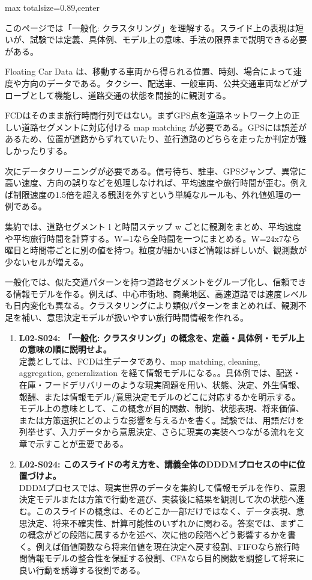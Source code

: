 \begin{minipage}[t]{0.58\textwidth}
\begin{adjustbox}{max totalsize={\textwidth}{0.89\textheight},center}
\begin{minipage}{\textwidth}\scriptsize
{}このページでは「一般化: クラスタリング」を理解する。スライド上の表現は短いが、試験では定義、具体例、モデル上の意味、手法の限界まで説明できる必要がある。\par
Floating Car Data は、移動する車両から得られる位置、時刻、場合によって速度や方向のデータである。タクシー、配送車、一般車両、公共交通車両などがプローブとして機能し、道路交通の状態を間接的に観測する。\par
FCDはそのまま旅行時間行列ではない。まずGPS点を道路ネットワーク上の正しい道路セグメントに対応付ける map matching が必要である。GPSには誤差があるため、位置が道路からずれていたり、並行道路のどちらを走ったか判定が難しかったりする。\par
次にデータクリーニングが必要である。信号待ち、駐車、GPSジャンプ、異常に高い速度、方向の誤りなどを処理しなければ、平均速度や旅行時間が歪む。例えば制限速度の1.5倍を超える観測を外すという単純なルールも、外れ値処理の一例である。\par
集約では、道路セグメント l と時間ステップ w ごとに観測をまとめ、平均速度や平均旅行時間を計算する。W=1なら全時間を一つにまとめる。W=24x7なら曜日と時間帯ごとに別の値を持つ。粒度が細かいほど情報は詳しいが、観測数が少ないセルが増える。\par
一般化では、似た交通パターンを持つ道路セグメントをグループ化し、信頼できる情報モデルを作る。例えば、中心市街地、商業地区、高速道路では速度レベルも日内変化も異なる。クラスタリングにより類似パターンをまとめれば、観測不足を補い、意思決定モデルが扱いやすい旅行時間情報を作れる。\par{}\begin{enumerate}\item \textbf{L02-S024: 「一般化: クラスタリング」の概念を、定義・具体例・モデル上の意味の順に説明せよ。}\\定義としては、FCDは生データであり、map matching, cleaning, aggregation, generalization を経て情報モデルになる。。具体例では、配送・在庫・フードデリバリーのような現実問題を用い、状態、決定、外生情報、報酬、または情報モデル/意思決定モデルのどこに対応するかを明示する。モデル上の意味として、この概念が目的関数、制約、状態表現、将来価値、または方策選択にどのような影響を与えるかを書く。試験では、用語だけを列挙せず、入力データから意思決定、さらに現実の実装へつながる流れを文章で示すことが重要である。\item \textbf{L02-S024: このスライドの考え方を、講義全体のDDDMプロセスの中に位置づけよ。}\\DDDMプロセスでは、現実世界のデータを集約して情報モデルを作り、意思決定モデルまたは方策で行動を選び、実装後に結果を観測して次の状態へ進む。このスライドの概念は、そのどこか一部だけではなく、データ表現、意思決定、将来不確実性、計算可能性のいずれかに関わる。答案では、まずこの概念がどの段階に属するかを述べ、次に他の段階へどう影響するかを書く。例えば価値関数なら将来価値を現在決定へ戻す役割、FIFOなら旅行時間情報モデルの整合性を保証する役割、CFAなら目的関数を調整して将来に良い行動を誘導する役割である。\end{enumerate}

\end{minipage}
\end{adjustbox}
\end{minipage}
